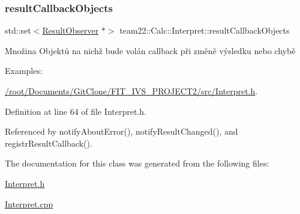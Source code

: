 \subsubsection{\texorpdfstring{result\+Callback\+Objects}{resultCallbackObjects}}
{\footnotesize\ttfamily std\+::set$<$\hyperlink{classteam22_1_1_calc_1_1_result_observer}{Result\+Observer} $\ast$$>$ team22\+::\+Calc\+::\+Interpret\+::result\+Callback\+Objects}

Množina Objektů na nichž bude volán callback při změně výsledku nebo chybě \begin{Desc}
\item[Examples\+: ]\par
\hyperlink{_2root_2_documents_2_git_clone_2_f_i_t__i_v_s__p_r_o_j_e_c_t2_2src_2_interpret_8h-example}{/root/\+Documents/\+Git\+Clone/\+F\+I\+T\+\_\+\+I\+V\+S\+\_\+\+P\+R\+O\+J\+E\+C\+T2/src/\+Interpret.\+h}.\end{Desc}


Definition at line 64 of file Interpret.\+h.



Referenced by notify\+About\+Error(), notify\+Result\+Changed(), and registr\+Result\+Callback().



The documentation for this class was generated from the following files\+:\begin{DoxyCompactItemize}
\item 
\hyperlink{_interpret_8h}{Interpret.\+h}\item 
\hyperlink{_interpret_8cpp}{Interpret.\+cpp}\end{DoxyCompactItemize}
